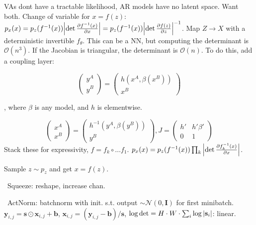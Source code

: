 \documentclass[11pt,landscape,a4paper,fleqn]{article}
\def\myvector#1{\mathbf{#1}}
\def\vb{{\myvector{b}}}
\def\vs{{\myvector{s}}}
\def\vx{{\myvector{x}}}
\def\vy{{\myvector{y}}}
\def\mymatrix#1{\mathbf{#1}}
\def\mI{{\mymatrix{I}}}
\begin{document}
\begin{multicols*}{4}
VAs dont have a tractable likelihood, AR models have no latent space.
Want both.
Change of variable for $x = f(z)$:
$p_x(x) = p_z(f^{-1}(x)) \abs{\det \pdv{f^{-1}(x)}{x}} = p_z(f^{-1}(x)) \abs{\det \pdv{f(z)}{z}}^{-1}$.
Map $Z \to X$ with a deterministic invertible $f_\theta$.
This can be a NN, but computing the determinant is $\mathcal{O}(n^3)$.
If the Jacobian is triangular, the determinant is $\mathcal{O}(n)$.
To do this, add a coupling layer:
\begin{minipage}{0.5\linewidth}
    \[\begin{pmatrix}
        y^A \\
        y^B
    \end{pmatrix} = \begin{pmatrix}
        h(x^A, \beta(x^B)) \\
        x^B
    \end{pmatrix}\]
\end{minipage}%
\hspace{0.3cm}%
\begin{minipage}{0.45\linewidth}
    , where $\beta$ is any model, and $h$ is elementwise.
\end{minipage}
\[\begin{pmatrix}
    x^A \\
    x^B
\end{pmatrix} = \begin{pmatrix}
    h^{-1}(y^A, \beta(y^B)) \\
    y^B
\end{pmatrix}, J = \begin{pmatrix}
    h' & h'\beta' \\
    0 & 1
\end{pmatrix}\]
Stack these for expressivity, $f = f_k \circ \dots f_1$.
$p_x(x) = p_z(f^{-1}(x)) \prod_k \abs{\det \pdv{f_k^{-1}(x)}{x}}$.

Sample $z \sim p_z$ and get $x = f(z)$.



\begin{wrapfigure}{R}{0.2\linewidth}
    
\end{wrapfigure}
\textbullet\ Squeeze: reshape, increase chan.

\textbullet\ ActNorm: batchnorm with init. s.t. output $\sim \mathcal{N}(0, \mI)$ for first minibatch.
    $\vy_{i,j} = \vs \odot \vx_{i,j} + \vb$,
    $\vx_{i, j} = (\vy_{i,j} - \vb) / \vs$,
    $\log\det = H \cdot W \cdot \sum_i \log \abs{\vs_i}$: linear.


\end{multicols*}
\end{document}
